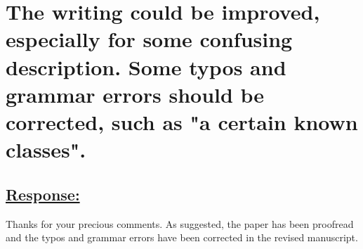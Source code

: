 \section{The writing could be improved, especially for some confusing description.
Some typos and grammar errors should be corrected, such as "a certain known classes".}

\subsection*{\underline{\textbf{Response:}}}

Thanks for your precious comments.
As suggested, the paper has been proofread and the typos and grammar errors have been corrected in the revised manuscript.
